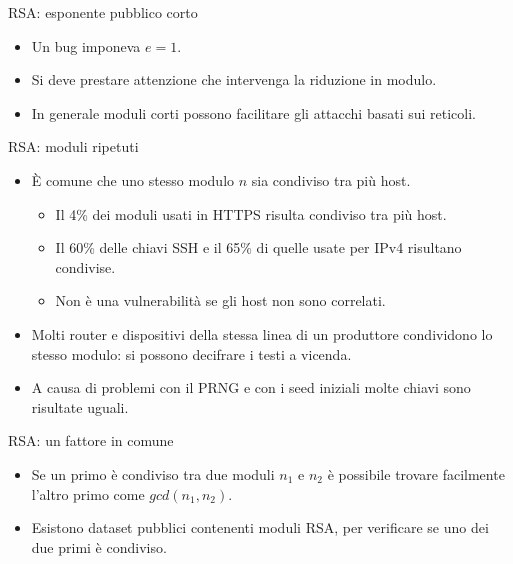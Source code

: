 \documentclass[11pt,svgnames,smaller,aspectratio=169,italian]{beamer}
\begin{document}
\begin{frame}{RSA: esponente pubblico corto}
	\begin{itemize}
		\item Un bug imponeva $e = 1$.
		\item Si deve prestare attenzione che intervenga la riduzione in modulo.
		\item In generale moduli corti possono facilitare gli attacchi basati sui reticoli.
	\end{itemize}
\end{frame}

\begin{frame}{RSA: moduli ripetuti}
	\begin{itemize}
		\item È comune che uno stesso modulo $n$ sia condiviso tra più host.
			\begin{itemize}
				\item Il 4\% dei moduli usati in HTTPS risulta condiviso tra più host.
				\item Il 60\% delle chiavi SSH e il 65\% di quelle usate per IPv4 risultano condivise.
				\item Non è una vulnerabilità se gli host non sono correlati.
			\end{itemize}
		\item Molti router e dispositivi della stessa linea di un produttore condividono lo stesso modulo: si possono decifrare i testi a vicenda.
		\item A causa di problemi con il PRNG e con i seed iniziali molte chiavi sono risultate uguali.
	\end{itemize}
\end{frame}


\begin{frame}{RSA: un fattore in comune}
	\begin{itemize}
		\item Se un primo è condiviso tra due moduli $n_{1}$ e $n_{2}$ è possibile trovare facilmente l'altro primo come $gcd(n_{1}, n_{2})$.
		\item Esistono dataset pubblici contenenti moduli RSA, per verificare se uno dei due primi è condiviso.
	\end{itemize}
\end{frame}
\end{document}
